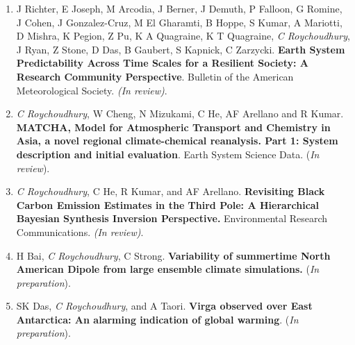 \documentclass[margin,line]{resume}
\begin{document}
\begin{resume}
\begin{enumerate}[topsep=1pt, partopsep=1pt, itemsep=0.5pt, parsep=0.1pt, leftmargin=15pt,label=\arabic*.]
			\item J Richter, E Joseph, M Arcodia, J Berner, J Demuth, P Falloon, G Romine, J Cohen, J Gonzalez-Cruz, M El Gharamti, B Hoppe, S Kumar, A Mariotti, D Mishra, K Pegion, Z Pu, K A Quagraine, K T Quagraine, \textit{C Roychoudhury}, J Ryan, Z Stone, D Das, B Gaubert, S Kapnick, C Zarzycki.
			\textbf{Earth System Predictability Across Time Scales for a Resilient Society: A Research Community Perspective}. Bulletin of the American Meteorological Society. \textit{(In review)}.
			
			
			\item \textit{C Roychoudhury}, W Cheng, N Mizukami, C He, AF Arellano and R Kumar. \textbf{MATCHA, Model for Atmospheric Transport and Chemistry in Asia, a novel regional climate-chemical reanalysis. Part 1: System description and initial evaluation}. Earth System Science Data. (\textit{In review}).
			
			\item \textit{C Roychoudhury}, C He, R Kumar, and AF Arellano. \textbf{Revisiting Black Carbon Emission Estimates in the Third Pole: A Hierarchical Bayesian Synthesis Inversion Perspective.} Environmental Research Communications. \textit{(In review)}. 
			
			
			\item H Bai, \textit{C Roychoudhury}, C Strong. \textbf{Variability of summertime North American Dipole from large ensemble climate simulations.} (\emph{In preparation}).
			
			\item SK Das, \textit{C Roychoudhury}, and A Taori.
			\textbf{Virga observed over East Antarctica: An alarming indication of global warming}. (\emph{In preparation}).
			
			
		\end{enumerate}
		
		

\end{resume}
\end{document}
